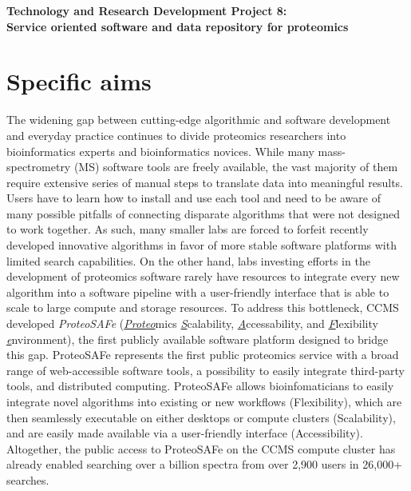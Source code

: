 \documentclass[arial,11pt]{article}
\begin{document}

\begin{center}
{\Large {\bf Technology and Research Development Project 8: \\
Service oriented software and data repository  for proteomics}}
\end{center}

\section{Specific aims}
The widening gap between cutting-edge algorithmic and software development and everyday practice continues to divide proteomics researchers into bioinformatics experts and bioinformatics novices. While many mass-spectrometry (MS) software tools are freely available, the vast majority of them require extensive series of manual steps to translate data into meaningful results. Users have to learn how to install and use each tool and need to be aware of many possible pitfalls of connecting disparate algorithms that were not designed to work together.  As such, many smaller labs  are forced to forfeit recently developed innovative algorithms in favor of more stable software platforms with limited search capabilities. On the other hand, labs investing efforts in the development of proteomics  software rarely have resources to integrate every new algorithm into a software pipeline with a user-friendly interface that is able to scale to large compute and storage resources. To address this bottleneck, CCMS developed {\em ProteoSAFe} (\underline{\em Proteo}mics \underline{\em S}calability, \underline{\em A}ccessability, and \underline{\em F}lexibility \underline{\em e}nvironment), the first publicly available software platform designed to bridge this gap. ProteoSAFe represents the first public proteomics service with a broad range of web-accessible software tools, a possibility to easily integrate third-party tools, and distributed computing. ProteoSAFe allows bioinfomaticians to easily integrate novel algorithms into existing or new workflows (Flexibility), which are then seamlessly executable on either desktops  or compute clusters (Scalability), and are easily made available  via a user-friendly interface (Accessibility). Altogether, the  public access to ProteoSAFe on the CCMS compute cluster has already enabled searching over a billion spectra from over 2,900 users in 26,000+ searches.
\end{document}
